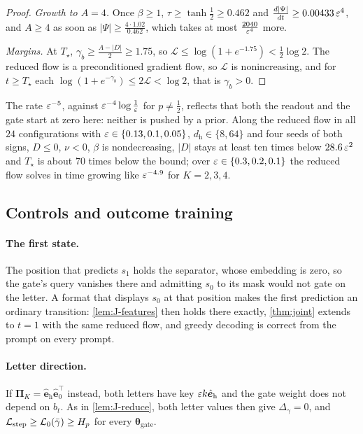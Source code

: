 \begin{proof}
\emph{Growth to $A=4$.} Once $\beta\ge1$, $\tau\ge\tanh\frac12\ge0.462$ and $\frac{d|\Psi|}{dt}\ge0.00433\,\varepsilon^4$, and $A\ge4$ as soon as $|\Psi|\ge\frac{4\cdot1.02}{0.462}$, which
takes at most $\frac{2040}{\varepsilon^4}$ more.

\emph{Margins.} At $T_\star$, $\gamma_b\ge\frac{A-|D|}{2}\ge1.75$, so $\mathcal L\le\log(1+e^{-1.75})<\frac12\log2$. The reduced flow is a preconditioned gradient flow,
so $\mathcal L$ is nonincreasing, and for $t\ge T_\star$ each $\log(1+e^{-\gamma_b})\le2\mathcal L<\log2$, that is $\gamma_b>0$.
\end{proof}
The rate $\varepsilon^{-5}$, against $\varepsilon^{-4}\log\frac1{\varepsilon}$ for $p\ne\frac12$, reflects that both the readout and the gate start at zero here: neither is
pushed by a prior. Along the reduced flow in all $24$ configurations with $\varepsilon\in\{0.13,0.1,0.05\}$, $d_{\mathrm h}\in\{8,64\}$ and four seeds of both signs,
$D\le0$, $\nu<0$, $\beta$ is nondecreasing, $|D|$ stays at least ten times below $28.6\,\varepsilon^2$ and $T_\star$ is about $70$ times below the bound;
over $\varepsilon\in\{0.3,0.2,0.1\}$ the reduced flow solves in time growing like $\varepsilon^{-4.9}$ for $K=2,3,4$.

\subsection{Controls and outcome training}

\paragraph{The first state.}\label{rem:first-state} The position that predicts $s_1$ holds the separator, whose embedding is zero, so
the gate's query vanishes there and admitting $s_0$ to its mask would not gate on the letter. A format that displays $s_0$ at that
position makes the first prediction an ordinary transition: \cref{lem:J-features} then holds there exactly, \cref{thm:joint} extends to
$t=1$ with the same reduced flow, and greedy decoding is correct from the prompt on every prompt.

\paragraph{Letter direction.} If $\bm\Pi_K=\hat{\bm e}_{\mathrm h}\hat{\bm e}_0^\top$ instead, both letters have key $\varepsilon k\hat{\bm e}_{\mathrm h}$ and the gate weight does not depend on $b_t$.
As in \cref{lem:J-reduce}, both letter values then give $\Delta_\gamma=0$, and $\mathcal L_{\mathrm{step}}\ge \mathcal L_0(\bar\gamma)\ge H_p$ for every $\bm\theta_{\mathrm{gate}}$.

